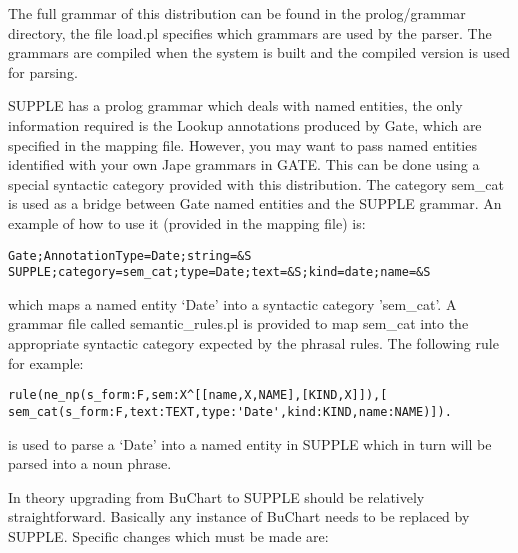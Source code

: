 The full grammar of this distribution can be found in the prolog/grammar
directory, the file load.pl specifies which grammars are used by the parser. The
grammars are compiled when the system is built and the compiled version is used
for parsing.


SUPPLE has a prolog grammar which deals with named entities, the only
information required is the Lookup annotations produced by Gate, which are
specified in the mapping file. However, you may want to pass named entities
identified with your own Jape grammars in GATE. This can be done using a special
syntactic category provided with this distribution. The category sem\_cat is
used as a bridge between Gate named entities and the SUPPLE grammar. An example
of how to use it (provided in the mapping file) is:

\begin{small}\begin{verbatim}
Gate;AnnotationType=Date;string=&S
SUPPLE;category=sem_cat;type=Date;text=&S;kind=date;name=&S
\end{verbatim}\end{small}
which maps a named entity `Date' into a syntactic  category
'sem\_cat'.  A grammar file called semantic\_rules.pl is provided
to map sem\_cat into the appropriate  syntactic category expected by
the phrasal rules. The following rule for example:
\begin{small}\begin{verbatim}
rule(ne_np(s_form:F,sem:X^[[name,X,NAME],[KIND,X]]),[
sem_cat(s_form:F,text:TEXT,type:'Date',kind:KIND,name:NAME)]).
\end{verbatim}\end{small}
is used to parse a `Date' into a named entity in SUPPLE which in turn
will be parsed into a noun phrase.


In theory upgrading from BuChart to SUPPLE should be relatively straightforward.
Basically any instance of BuChart needs to be replaced by SUPPLE. Specific changes
which must be made are:

